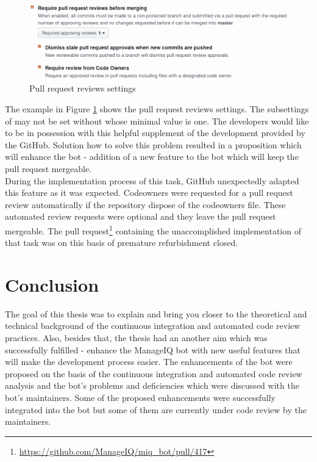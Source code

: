 \begin{figure}[H]
    \centering
    \includegraphics[scale=0.25]{img/codeowners_settings.pdf}
    \caption{Pull request reviews settings}
    \label{fig:codeowners_settings}
\end{figure}

The example in Figure \ref{fig:codeowners_settings} shows the pull request reviews settings. The subsettings of  may not be set without  whose minimal value is one. The developers would like to be in possession with this helpful supplement of the development provided by the GitHub. Solution how to solve this problem resulted in a proposition which will enhance the bot - addition of a new feature to the bot which will keep the pull request mergeable.\\

During the implementation process of this task, GitHub unexpectedly adapted this feature as it was expected. Codeowners were requested for a pull request review automatically if the repository dispose of the codeowners file. These automated review requests were optional and they leave the pull request mergeable. The pull request\footnote{\url{https://github.com/ManageIQ/miq_bot/pull/417}} containing the unaccomplished implementation of that task was on this basis of premature refurbishment closed.

\chapter{Conclusion}

The goal of this thesis was to explain and bring you closer to the theoretical and technical background of the continuous integration and automated code review practices. Also, besides that, the thesis had an another aim which was successfully fulfilled - enhance the ManageIQ bot with new useful features that will make the development process easier. The enhancements of the bot were proposed on the basis of the continuous integration and automated code review analysis and the bot's problems and deficiencies which were discussed with the bot's maintainers. Some of the proposed enhancements were successfully integrated into the bot but some of them are currently under code review by the maintainers.\\

